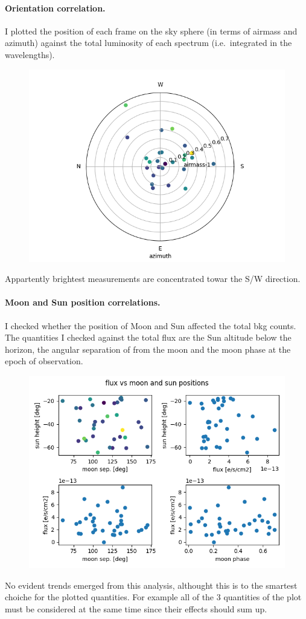 \documentclass{article}
\begin{document}
\paragraph{Orientation correlation.} I plotted the position of each frame on the sky sphere (in terms of airmass and azimuth) against the total luminosity of each spectrum (i.e.\ integrated in the wavelengths).
\begin{figure}[h!]
	\centering
	\includegraphics[width=.75\textwidth]{../radial}
\end{figure}
Appartently brightest measurements are concentrated towar the S/W direction.

\paragraph{Moon and Sun position correlations.}
I checked whether the position of Moon and Sun affected the total bkg counts. The quantities I checked against the total flux are the Sun altitude below the horizon, the angular separation of from the moon and the moon phase at the epoch of observation.
	\begin{figure}[h!]
	\centering
	\includegraphics[width=.75\textwidth]{../positions}
\end{figure}
No evident trends emerged from this analysis, althought this is to the smartest choiche for the plotted quantities. For example all of the 3 quantities of the plot must be considered at the same time since their effects should sum up.
\end{document}
